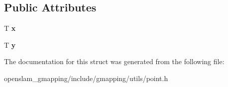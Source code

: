 \subsection*{Public Attributes}
\begin{DoxyCompactItemize}
\item 
\mbox{\label{structGMapping_1_1point_a1e3816abbc8b56607fa741952fe74a8c}} 
T {\bfseries x}
\item 
\mbox{\label{structGMapping_1_1point_ae25e311e074409d6329c2e66741006f1}} 
T {\bfseries y}
\end{DoxyCompactItemize}


The documentation for this struct was generated from the following file\+:\begin{DoxyCompactItemize}
\item 
openslam\+\_\+gmapping/include/gmapping/utils/point.\+h\end{DoxyCompactItemize}
